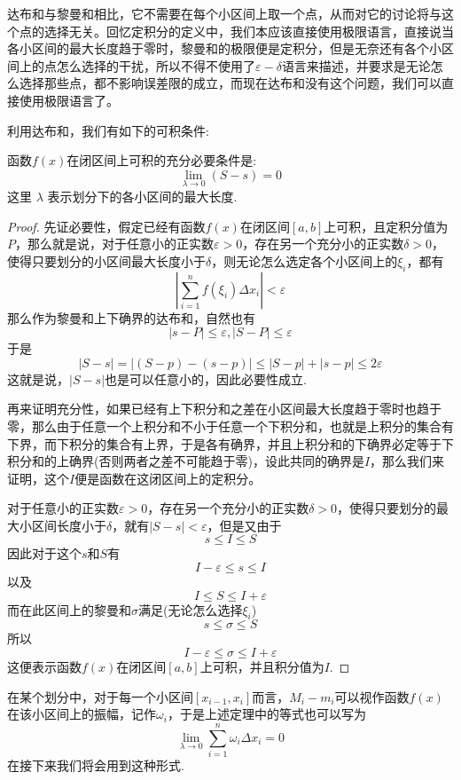 达布和与黎曼和相比，它不需要在每个小区间上取一个点，从而对它的讨论将与这个点的选择无关。回忆定积分的定义中，我们本应该直接使用极限语言，直接说当各小区间的最大长度趋于零时，黎曼和的极限便是定积分，但是无奈还有各个小区间上的点怎么选择的干扰，所以不得不使用了$\varepsilon-\delta$语言来描述，并要求是无论怎么选择那些点，都不影响误差限的成立，而现在达布和没有这个问题，我们可以直接使用极限语言了。

利用达布和，我们有如下的可积条件:
\begin{theorem}
  函数$f(x)$在闭区间上可积的充分必要条件是:
  \[ \lim_{\lambda \to 0} (S - s) = 0 \]
  这里 $\lambda$ 表示划分下的各小区间的最大长度.
\end{theorem}

\begin{proof}
  先证必要性，假定已经有函数$f(x)$在闭区间$[a,b]$上可积，且定积分值为$P$，那么就是说，对于任意小的正实数$\varepsilon > 0$，存在另一个充分小的正实数$\delta > 0$，使得只要划分的小区间最大长度小于$\delta$，则无论怎么选定各个小区间上的$\xi_i$，都有
  \[ \left| \sum_{i=1}^n f(\xi_i) \Delta x_i \right| < \varepsilon \]
  那么作为黎曼和上下确界的达布和，自然也有
  \[ |s-P| \leqslant \varepsilon, |S-P| \leqslant \varepsilon \]
  于是
  \[ |S-s| = |(S-p) - (s-p)| \leqslant |S-p| + |s-p| \leqslant 2\varepsilon \]
  这就是说，$|S-s|$也是可以任意小的，因此必要性成立.

  再来证明充分性，如果已经有上下积分和之差在小区间最大长度趋于零时也趋于零，那么由于任意一个上积分和不小于任意一个下积分和，也就是上积分的集合有下界，而下积分的集合有上界，于是各有确界，并且上积分和的下确界必定等于下积分和的上确界(否则两者之差不可能趋于零)，设此共同的确界是$I$，那么我们来证明，这个$I$便是函数在这闭区间上的定积分。

  对于任意小的正实数$\varepsilon > 0$，存在另一个充分小的正实数$\delta > 0$，使得只要划分的最大小区间长度小于$\delta$，就有$|S-s|<\varepsilon$，但是又由于
  \[ s \leqslant I \leqslant S \]
  因此对于这个$s$和$S$有
  \[ I - \varepsilon \leqslant s \leqslant I \]
  以及
  \[ I \leqslant  S \leqslant I+\varepsilon \]
  而在此区间上的黎曼和$\sigma$满足(无论怎么选择$\xi_i$)
  \[ s \leqslant \sigma \leqslant S \]
  所以
  \[ I - \varepsilon \leqslant \sigma \leqslant I+\varepsilon \]
  这便表示函数$f(x)$在闭区间$[a,b]$上可积，并且积分值为$I$.
\end{proof}

在某个划分中，对于每一个小区间$[x_{i-1},x_i]$而言，$M_i-m_i$可以视作函数$f(x)$在该小区间上的振幅，记作$\omega_i$，于是上述定理中的等式也可以写为
\[ \lim_{\lambda \to 0} \sum_{i=1}^n \omega_i \Delta x_i = 0 \]
在接下来我们将会用到这种形式.

